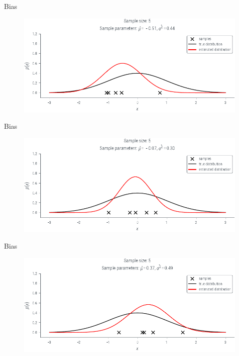 \documentclass{beamer}
\begin{document}
             \begin{frame}{Bias }
            \begin{figure}
                \includegraphics{../figures/mle/biased-mle-normal-5-2.pdf}
            \end{figure}
            
        \end{frame}

             \begin{frame}{Bias }
            \begin{figure}
                \includegraphics{../figures/mle/biased-mle-normal-5-3.pdf}
            \end{figure}
            
        \end{frame}

             \begin{frame}{Bias }
            \begin{figure}
                \includegraphics{../figures/mle/biased-mle-normal-5-4.pdf}
            \end{figure}
            
        \end{frame}
\end{document}
